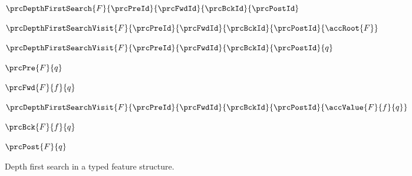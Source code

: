 \documentclass[11pt,a4paper,oneside,titlepage]{alb-latex}
\begin{document}
%
\begin{algorithm}
  $\prcDepthFirstSearch%
  {F}{\prcPreId}{\prcFwdId}{\prcBckId}{\prcPostId}$
  \begin{albAlgorithmic}
  \item \label{ln:alb-algorithms-documentation:depth-first-search-1} %

  \item \label{ln:alb-algorithms-documentation:depth-first-search-2} %
    $\prcDepthFirstSearchVisit%
    {F}{\prcPreId}{\prcFwdId}{\prcBckId}{\prcPostId}%
    {\accRoot{F}}$
  \end{albAlgorithmic}

  \medskip{}

  $\prcDepthFirstSearchVisit%
  {F}{\prcPreId}{\prcFwdId}{\prcBckId}{\prcPostId}{q}$
  \begin{albAlgorithmic}
  \item \label{ln:alb-algorithms-documentation:depth-first-search-3} %
    $\prcPre{F}{q}$

  \item \label{ln:alb-algorithms-documentation:depth-first-search-4} %

  \item \label{ln:alb-algorithms-documentation:depth-first-search-5} %

    \begin{albBlock}
    \item \label{ln:alb-algorithms-documentation:depth-first-search-6} %
      $\prcFwd{F}{f}{q}$

    \item \label{ln:alb-algorithms-documentation:depth-first-search-7} %

      \begin{albBlock}
      \item \label{ln:alb-algorithms-documentation:depth-first-search-8} %
        $\prcDepthFirstSearchVisit%
        {F}{\prcPreId}{\prcFwdId}{\prcBckId}{\prcPostId}%
        {\accValue{F}{f}{q}}$
      \end{albBlock}

    \item \label{ln:alb-algorithms-documentation:depth-first-search-9} %
      $\prcBck{F}{f}{q}$
    \end{albBlock}

  \item \label{ln:alb-algorithms-documentation:depth-first-search-10} %
    $\prcPost{F}{q}$
  \end{albAlgorithmic}
  \caption{Depth first search in a typed feature structure.}
  \label{alg:depth-first-search}
\end{algorithm}
%
\end{document}
